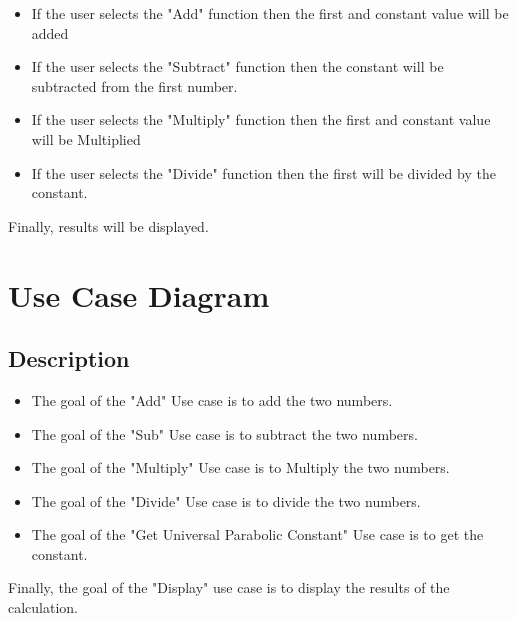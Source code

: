 \documentclass{report}
\begin{document}
\begin{itemize}
    \item If the user selects the "Add" function then the first and constant value will be added
    \item If the user selects the "Subtract" function then the constant will be subtracted from the first number.
    \item If the user selects the "Multiply" function then the first and constant value will be Multiplied
    \item If the user selects the "Divide" function then the first will be divided by the constant.
\end{itemize}
Finally, results will be displayed.


\newpage
\newpage
\chapter{Use Case Diagram}


\section{Description}
\begin{itemize}
    \item The goal of the "Add" Use case is to add the two numbers. 
    \item The goal of the "Sub" Use case is to subtract the two numbers. 
    \item The goal of the "Multiply" Use case is to Multiply the two numbers. 
    \item The goal of the "Divide" Use case is to divide the two numbers.
    \item The goal of the "Get Universal Parabolic Constant" Use case is to get the constant.
\end{itemize}
Finally, the goal of the "Display" use case is to display the results of the calculation.



\end{document}
